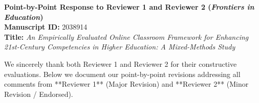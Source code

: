 \documentclass[11pt, a4paper]{article}
\begin{document}
\begin{center}
    {\large\textbf{Point-by-Point Response to Reviewer 1 and Reviewer 2 (\textit{Frontiers in Education})}} \\[0.4em]
    \normalsize\textbf{Manuscript ID:} 2038914 \\[0.2em]
    \normalsize\textbf{Title:} \textit{An Empirically Evaluated Online Classroom Framework for Enhancing 21st-Century Competencies in Higher Education: A Mixed-Methods Study}
\end{center}

\vspace{0.3em}
We sincerely thank both Reviewer 1 and Reviewer 2 for their constructive evaluations. Below we document our point-by-point revisions addressing all comments from **Reviewer 1** (Major Revision) and **Reviewer 2** (Minor Revision / Endorsed).
\end{document}
